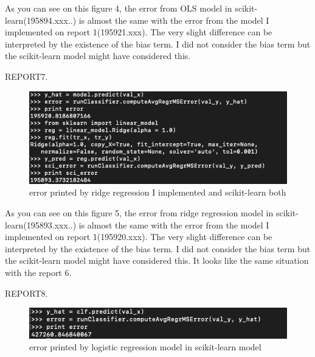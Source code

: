 \documentclass[a4 paper]{article}
\numberwithin{equation}{section}
\newcommand{\0}{\mathbf{0}}
\begin{document}
As you can see on this figure 4, the error from OLS model in scikit-learn(195894.xxx..) is almost the same with the error from the model I implemented on report 1(195921.xxx). The very slight difference can be interpreted by the existence of the bias term. I did not consider the bias term but the scikit-learn model might have considered this.

REPORT7.
\begin{figure}[h] 

\begin{center}

\includegraphics[width=1.0\linewidth]{ridge regression model by myself and by scikit-learn.png}

\end{center}

\caption{error printed by ridge regression I implemented and scikit-learn both }

\label{fig:long}

\label{fig:onecol}

\end{figure}

As you can see on this figure 5, the error from ridge regression model in scikit-learn(195893.xxx..) is almost the same with the error from the model I implemented on report 1(195920.xxx). The very slight difference can be interpreted by the existence of the bias term. I did not consider the bias term but the scikit-learn model might have considered this. It looks like the same situation with the report 6.

REPORT8.
\begin{figure}[h] 

\begin{center}

\includegraphics[width=1.0\linewidth]{Logistic regression model in scikit-learn model.png}
\end{center}

\caption{error printed by logistic regression model in scikit-learn model}

\label{fig:long}

\label{fig:onecol}

\end{figure}
\end{document}
